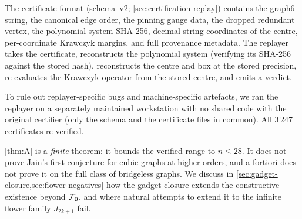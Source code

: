 The certificate format (schema~v2; \cref{sec:certification-replay})
contains the graph6 string, the canonical edge order, the pinning
gauge data, the dropped redundant vertex, the polynomial-system
SHA-256, decimal-string coordinates of the centre, per-coordinate
Krawczyk margins, and full provenance metadata. The replayer takes
the certificate, reconstructs the polynomial system (verifying its
SHA-256 against the stored hash), reconstructs the centre and box at
the stored precision, re-evaluates the Krawczyk operator from the
stored centre, and emits a verdict.

To rule out replayer-specific bugs and machine-specific artefacts, we
ran the replayer on a separately maintained workstation with no
shared code with the original certifier (only the schema and the
certificate files in common). All $3\,247$ certificates re-verified.

\begin{remark}
\label{rem:finite-thm-honest-scope}
\cref{thm:A} is a \emph{finite} theorem: it bounds the verified range
to $n \le 28$. It does not prove Jain's first conjecture for cubic
graphs at higher orders, and a fortiori does not prove it on the full
class of bridgeless graphs. We discuss in
\cref{sec:gadget-closure,sec:flower-negatives} how the gadget closure
extends the constructive existence beyond $\mathcal{F}_0$, and where natural
attempts to extend it to the infinite flower family $J_{2k+1}$ fail.
\end{remark}
